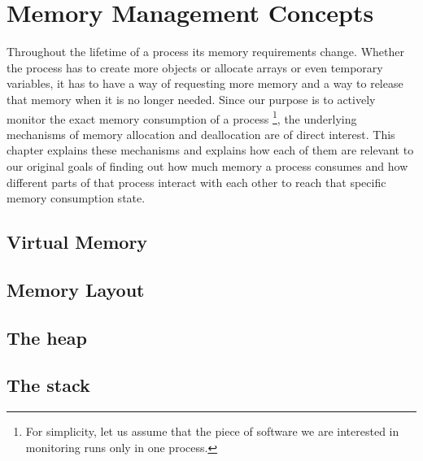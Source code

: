 \chapter{Memory Management Concepts}
\label{chapter:memmgmt}

Throughout the lifetime of a process its memory requirements change. Whether the process has to create more objects or allocate arrays or even temporary variables, it has to have a way of requesting more memory and a way to release that memory when it is no longer needed. Since our purpose is to actively monitor the exact memory consumption of a process \footnote{For simplicity, let us assume that the piece of software we are interested in monitoring runs only in one process.}, the underlying mechanisms of memory allocation and deallocation are of direct interest.  This chapter explains these mechanisms and explains how each of them are relevant to our original goals of finding out how much memory a process consumes and how different parts of that process interact with each other to reach that specific memory consumption state.

\newpage

\section{Virtual Memory}
\label{section:virtmem}



\section{Memory Layout}
\label{section:memlayout}

\section{The heap}
\label{section:heap}

\section{The stack}
\label{section:stack}
